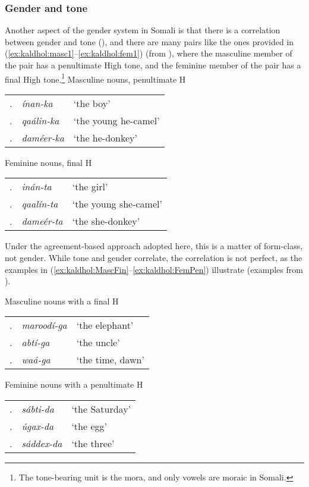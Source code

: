 \documentclass[output=paper]{langscibook}
\begin{document}
\subsubsection{Gender and tone}\label{sec:kaldhol:tone}
Another aspect of the gender system in Somali is that there is a correlation between gender and tone (\citealt{Armstrong1934}), and there are many pairs like the ones provided in (\ref{ex:kaldhol:masc1}--\ref{ex:kaldhol:fem1}) (from \citealt[172]{Hyman1981}), where the masculine member of the pair has a penultimate High tone, and the feminine member of the pair has a final High tone.\footnote{The tone-bearing unit is the mora, and only vowels are moraic in Somali.}
\ea\label{ex:kaldhol:masc1}
		Masculine nouns, penultimate H\\
		\begin{tabular}{lll}
		\myletter. & \textit{ínan-ka}   & `the boy'         \\
		\myletter. & \textit{qaálin-ka}  & `the young he-camel' \\
		\myletter. & \textit{daméer-ka}  &`the he-donkey'     
	    \end{tabular}\setcounter{mycounter}{0}
\ex\label{ex:kaldhol:fem1}
		Feminine nouns, final H\\
		\begin{tabular}{lll}
		\myletter. & \textit{inán-ta} & `the girl'         \\
		\myletter. & \textit{qaalín-ta} & `the young she-camel' \\
		\myletter. & \textit{dameér-ta} & `the she-donkey'    
	    \end{tabular}\setcounter{mycounter}{0}
\z
Under the agreement-based approach adopted here, this is a matter of form-class, not gender. While tone and gender correlate, the correlation is not perfect, as the examples in (\ref{ex:kaldhol:MascFin}--\ref{ex:kaldhol:FemPen}) illustrate (examples from \citealt{Andrzejewski1964,Hyman1981,Saeed1999a}).

\ea\label{ex:kaldhol:MascFin}
	Masculine nouns with a final H\\
	\begin{tabular}{lll}
		\myletter. & \textit{maroodí-ga} &`the elephant'\\
		\myletter. & \textit{abtí-ga} &`the uncle'\\
		\myletter. & \textit{waá-ga} &`the time, dawn'
	\end{tabular}\setcounter{mycounter}{0}
\ex\label{ex:kaldhol:FemPen}
	Feminine nouns with a penultimate H\\
	\begin{tabular}{lll}
		\myletter. & \textit{sábti-da} &`the Saturday'\\
		\myletter. & \textit{úgax-da} &`the egg'\\
		\myletter. & \textit{sáddex-da} &`the three'\footnotemark{}
	\end{tabular}\setcounter{mycounter}{0}
\z
{}
\end{document}
